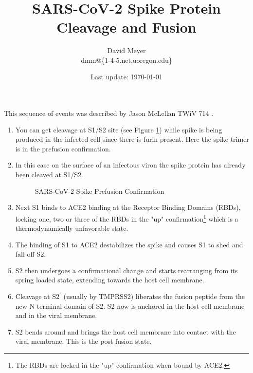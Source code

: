 \documentclass[11pt, oneside]{article}   	%
\title{SARS-CoV-2 Spike Protein Cleavage and Fusion}
\author{David Meyer \\ dmm@\{1-4-5.net,uoregon.edu\}}
\date{Last update: \today}							%
\begin{document}
\maketitle

\noindent
This sequence of events was described by Jason McLellan TWiV 714 \cite{covid:spike}.

\begin{enumerate}
\item You can get cleavage at S1/S2 site (see Figure \ref{fig:prefusion}) while spike is being produced in the
infected cell since there is	furin present. Here the spike trimer is in the prefusion confirmation.

\item In this case on the surface of an infectous viron the spike protein has already been cleaved at S1/S2. 

\bigskip
\begin{figure} [H]
\caption{SARS-CoV-2 Spike Prefusion Confirmation \cite{covid:prefusion}}
\label{fig:prefusion}
\end{figure}


\item  Next S1 binds to ACE2 binding at the Receptor Binding Domains (RBDs),
locking one, two or three of the RBDs in the "up" confirmation\footnote{The RBDs are locked 
in the "up" confirmation when bound by ACE2.} which is a thermodynamically unfavorable state.

\item The binding of S1 to ACE2 destabilizes the spike and causes S1 to shed and fall off S2.

\item S2 then undergoes a confirmational change and starts rearranging from its spring loaded state, extending
towards the host cell membrane.

\item Cleavage at $\text{S2}^\prime$ (usually by TMPRSS2)  liberates the fusion peptide from the new N-terminal
domain of S2. S2 now is anchored in the host cell membrane and in the
viral membrane.
	
\item S2 bends around and brings the host cell membrane into contact
with the viral membrane. This is the post fusion state.

\end{enumerate}





\end{document}
